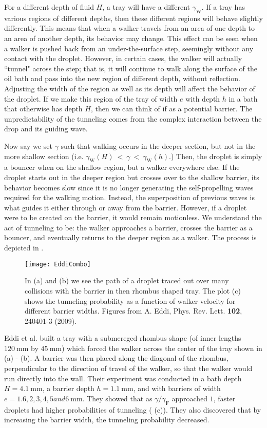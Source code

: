 For a different depth of fluid $H$, a tray will have a different $\gamma_\mathrm{W}$. If a tray has various regions of different depths, then these different regions will behave slightly differently. This means that when a walker travels from an area of one depth to an area of another depth, its behavior may change. This effect can be seen when a walker is pushed back from an under-the-surface step, seemingly without any contact with the droplet. However, in certain cases, the walker will actually ``tunnel" across the step; that is, it will continue to walk along the surface of the oil bath and pass into the new region of different depth, without reflection. Adjusting the width of the region as well as its depth will affect the behavior of the droplet. If we make this region of the tray of width $e$ with depth $h$ in a bath that otherwise has depth $H$, then we can think of if as a potential barrier. The unpredictability of the tunneling comes from the complex interaction between the drop and its guiding wave. 

Now say we set $\gamma$ such that walking occurs in the deeper section, but not in the more shallow section (i.e.  $\gamma_\mathrm{W}(H)~<~\gamma~<~\gamma_\mathrm{W}(h)$.) Then, the droplet is simply a bouncer when on the shallow region, but a walker everywhere else. If the droplet starts out in the deeper region but crosses over to the shallow barrier, its behavior becomes slow since it is no longer generating the self-propelling waves required for the walking motion. Instead, the superposition of previous waves is what guides it either through or away from the barrier. However, if a droplet were to be created on the barrier, it would remain motionless. We understand the act of tunneling to be: the walker approaches a barrier, crosses the barrier as a bouncer, and eventually returns to the deeper region as a walker. The process is depicted in . 

\begin{figure}[]
  \texttt{[image: EddiCombo]}
\caption{In (a) and (b) we see the path of a droplet traced out over many collisions with the barrier in then rhombus shaped tray. The plot (c) shows the tunneling probability as a function of walker velocity for different barrier widths. Figures from A. Eddi, Phys. Rev. Lett. \textbf{102}, 240401-3 (2009).}
\label{fig:Eddi}
	\end{figure}

Eddi et al. built a tray with a submereged rhombus shape (of inner lengths $120~\mathrm{mm}$ by $45~\mathrm{mm}$) which forced the walker across the center of the tray shown in  (a) - (b). A barrier was then placed along the diagonal of the rhombus, perpendicular to the direction of travel of the walker, so that the walker would run directly into the wall. Their experiment was conducted in a bath depth $H = 4.1~\mathrm{mm}$, a barrier depth $h = 1.1~\mathrm{mm}$, and with barriers of width $e = 1.6, 2, 3, 4, 5 and 6~\mathrm{mm}$. They showed that as $\gamma/\gamma_\mathrm{F}$ approached $1$, faster droplets had higher probabilities of tunneling ( (c)). They also discovered that by increasing the barrier width, the tunneling probability decreased. 

